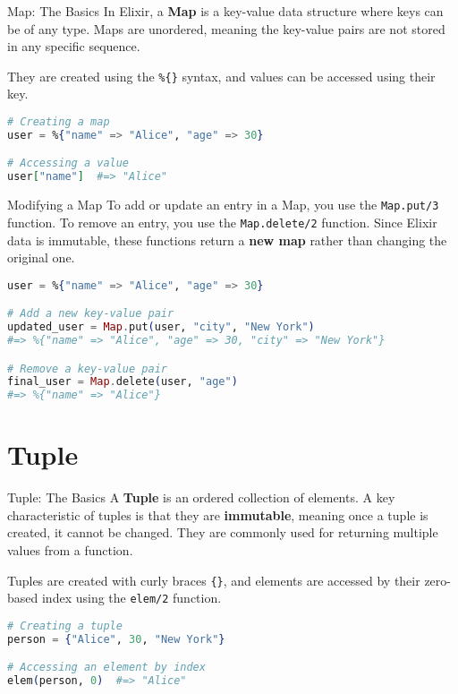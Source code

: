 \documentclass[aspectratio=169, table]{beamer}
\begin{document}
\begin{frame}[fragile]{Map: The Basics}
\vspace{20pt}
In Elixir, a \textbf{Map} is a key-value data structure where keys can be of any type. Maps are unordered, meaning the key-value pairs are not stored in any specific sequence.

They are created using the \texttt{\%\{\}} syntax, and values can be accessed using their key.

\begin{lstlisting}[language=Elixir]
# Creating a map
user = %{"name" => "Alice", "age" => 30}

# Accessing a value
user["name"]  #=> "Alice"
\end{lstlisting}
\end{frame}

\begin{frame}[fragile]{Modifying a Map}
\vspace{20pt}
To add or update an entry in a Map, you use the \texttt{Map.put/3} function. To remove an entry, you use the \texttt{Map.delete/2} function. Since Elixir data is immutable, these functions return a \textbf{new map} rather than changing the original one.

\begin{lstlisting}[language=Elixir]
user = %{"name" => "Alice", "age" => 30}

# Add a new key-value pair
updated_user = Map.put(user, "city", "New York")
#=> %{"name" => "Alice", "age" => 30, "city" => "New York"}

# Remove a key-value pair
final_user = Map.delete(user, "age")
#=> %{"name" => "Alice"}
\end{lstlisting}
\end{frame}

\section{Tuple}

\begin{frame}[fragile]{Tuple: The Basics}
\vspace{20pt}
A \textbf{Tuple} is an ordered collection of elements. A key characteristic of tuples is that they are \textbf{immutable}, meaning once a tuple is created, it cannot be changed. They are commonly used for returning multiple values from a function.

Tuples are created with curly braces \texttt{\{\}}, and elements are accessed by their zero-based index using the \texttt{elem/2} function.

\begin{lstlisting}[language=Elixir]
# Creating a tuple
person = {"Alice", 30, "New York"}

# Accessing an element by index
elem(person, 0)  #=> "Alice"
\end{lstlisting}
\end{frame}
\end{document}
